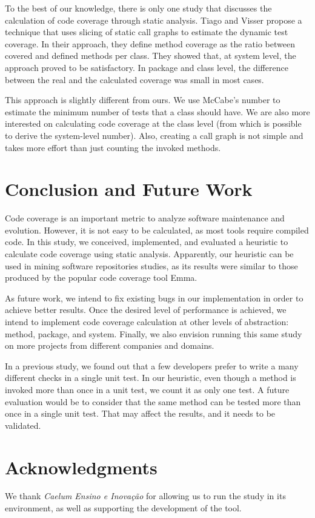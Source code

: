 \documentclass{sig-alternate}
\begin{document}
To the best of our knowledge, there is only one study that discusses the calculation of
code coverage through static analysis. Tiago and Visser \cite{tiago} propose a
technique that uses slicing of static call graphs to estimate the
dynamic test coverage. 
In their approach, they define method coverage as the ratio between covered 
and defined methods per class. They showed that, at system level, the approach
proved to be satisfactory. In package and class level, the difference between
the real and the calculated coverage was small in most cases.

This approach is slightly different from ours. We use McCabe's number to estimate the
minimum number of tests that a class should have. We are also more interested on calculating
code coverage at the class level (from which is possible to derive the system-level number). 
Also, creating a call graph is not simple and takes more effort than just counting
the invoked methods.

\section{Conclusion and Future Work}
\label{sec-conclusion}

Code coverage is an important metric to analyze software maintenance and evolution. However, it is 
not easy to be calculated, as most tools require compiled code. In this study, we conceived, implemented, 
and evaluated a heuristic to calculate code coverage using static analysis. Apparently, our heuristic can be used 
in mining software repositories studies, as its results were similar to those produced by the popular
code coverage tool Emma. 

As future work, we intend to fix existing bugs in our implementation in order to
achieve better results. Once the desired level of performance is achieved, we intend to implement code coverage
calculation at other levels of abstraction: method, package, and system. Finally, we also 
envision running this same study on more projects from different companies and domains.

In a previous study, we found out that a few developers prefer to write a many different checks in a single
unit test. In our heuristic, even though a method is invoked more than once in a unit test, we count it 
as only one test. A future evaluation would be to consider that the same method can be tested more than once
in a single unit test. That may affect the results, and it needs to be validated.


\section{Acknowledgments}

We thank \textit{Caelum Ensino e Inovação} for allowing us to run the study in its environment,
as well as supporting the development of the tool.



\end{document}
